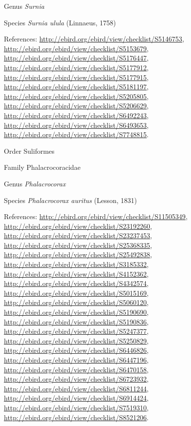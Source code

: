\documentclass[9pt, article]{memoir}
\begin{document}
\begin{multicols}{2}
\vspace{6pt}\noindent\hspace{30pt}Genus \textit{Surnia}


\vspace{6pt}\noindent\hspace{36pt}Species \textit{Surnia ulula} (Linnaeus, 1758)


\vspace{6pt}References: 
\url{http://ebird.org/ebird/view/checklist/S5146753}, 
\url{http://ebird.org/ebird/view/checklist/S5153679}, 
\url{http://ebird.org/ebird/view/checklist/S5176447}, 
\url{http://ebird.org/ebird/view/checklist/S5177912}, 
\url{http://ebird.org/ebird/view/checklist/S5177915}, 
\url{http://ebird.org/ebird/view/checklist/S5181197}, 
\url{http://ebird.org/ebird/view/checklist/S5205805}, 
\url{http://ebird.org/ebird/view/checklist/S5206629}, 
\url{http://ebird.org/ebird/view/checklist/S6492243}, 
\url{http://ebird.org/ebird/view/checklist/S6493653}, 
\url{http://ebird.org/ebird/view/checklist/S7748815}.

\vspace{6pt}\noindent\hspace{18pt}Order Suliformes


\vspace{6pt}\noindent\hspace{24pt}Family Phalacrocoracidae


\vspace{6pt}\noindent\hspace{30pt}Genus \textit{Phalacrocorax}


\vspace{6pt}\noindent\hspace{36pt}Species \textit{Phalacrocorax auritus} (Lesson, 1831)


\vspace{6pt}References: 
\url{http://ebird.org/ebird/view/checklist/S11505349}, 
\url{http://ebird.org/ebird/view/checklist/S23192260}, 
\url{http://ebird.org/ebird/view/checklist/S23237453}, 
\url{http://ebird.org/ebird/view/checklist/S25368335}, 
\url{http://ebird.org/ebird/view/checklist/S25492838}, 
\url{http://ebird.org/ebird/view/checklist/S3185332}, 
\url{http://ebird.org/ebird/view/checklist/S4152362}, 
\url{http://ebird.org/ebird/view/checklist/S4342574}, 
\url{http://ebird.org/ebird/view/checklist/S5015169}, 
\url{http://ebird.org/ebird/view/checklist/S5060120}, 
\url{http://ebird.org/ebird/view/checklist/S5190690}, 
\url{http://ebird.org/ebird/view/checklist/S5190836}, 
\url{http://ebird.org/ebird/view/checklist/S5247377}, 
\url{http://ebird.org/ebird/view/checklist/S5250829}, 
\url{http://ebird.org/ebird/view/checklist/S6446826}, 
\url{http://ebird.org/ebird/view/checklist/S6447196}, 
\url{http://ebird.org/ebird/view/checklist/S6470158}, 
\url{http://ebird.org/ebird/view/checklist/S6723932}, 
\url{http://ebird.org/ebird/view/checklist/S6811244}, 
\url{http://ebird.org/ebird/view/checklist/S6914424}, 
\url{http://ebird.org/ebird/view/checklist/S7519310}, 
\url{http://ebird.org/ebird/view/checklist/S8521206}.


\end{multicols}
\end{document}
